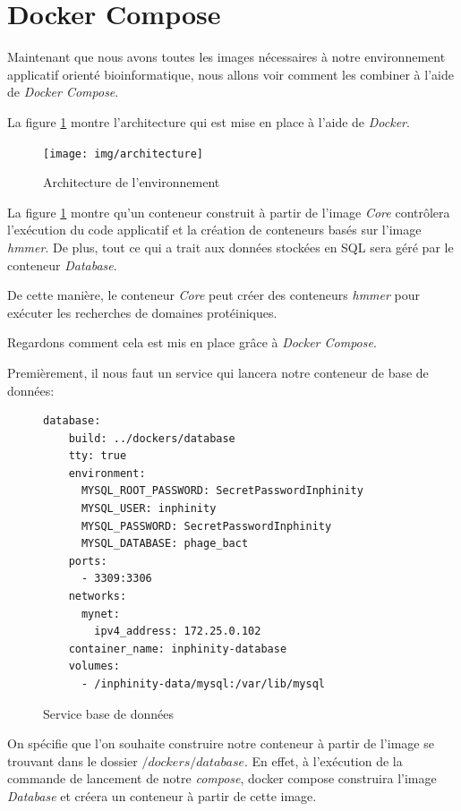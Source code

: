 \newpage
\section{Docker Compose}
Maintenant que nous avons toutes les images nécessaires à notre environnement applicatif orienté bioinformatique, nous allons voir comment les combiner à l'aide de \emph{Docker Compose}.

La figure \ref{fig:architecture} montre l'architecture qui est mise en place à l'aide de \emph{Docker}.

\begin{figure}[H] 
\centering 
\texttt{[image: img/architecture]} 
\caption[architecture]{Architecture de l'environnement}
\label{fig:architecture} 
\end{figure}

La figure \ref{fig:architecture} montre qu'un conteneur construit à partir de l'image \emph{Core} contrôlera l'exécution du code applicatif et la création de conteneurs basés sur l'image \emph{hmmer}. De plus, tout ce qui a trait aux données stockées en SQL sera géré par le conteneur \emph{Database}.

De cette manière, le conteneur \emph{Core} peut créer des conteneurs \emph{hmmer} pour exécuter les recherches de domaines protéiniques.

Regardons comment cela est mis en place grâce à \emph{Docker Compose}. 

\newpage
Premièrement, il nous faut un service qui lancera notre conteneur de base de données:

\begin{figure}[H] 
\centering 
\begin{lstlisting}[frame=single]
database:
    build: ../dockers/database
    tty: true
    environment:
      MYSQL_ROOT_PASSWORD: SecretPasswordInphinity
      MYSQL_USER: inphinity
      MYSQL_PASSWORD: SecretPasswordInphinity
      MYSQL_DATABASE: phage_bact
    ports:
      - 3309:3306
    networks:
      mynet:
        ipv4_address: 172.25.0.102
    container_name: inphinity-database
    volumes:
      - /inphinity-data/mysql:/var/lib/mysql
\end{lstlisting}
\caption[Service base de données]{Service base de données}
\label{fig:serviceDb} 
\end{figure}

On spécifie que l'on souhaite construire notre conteneur à partir de l'image se trouvant dans le dossier \emph{$/dockers/database$}. En effet, à l'exécution de la commande de lancement de notre \emph{compose}, docker compose construira l'image \emph{Database} et créera un conteneur à partir de cette image.

